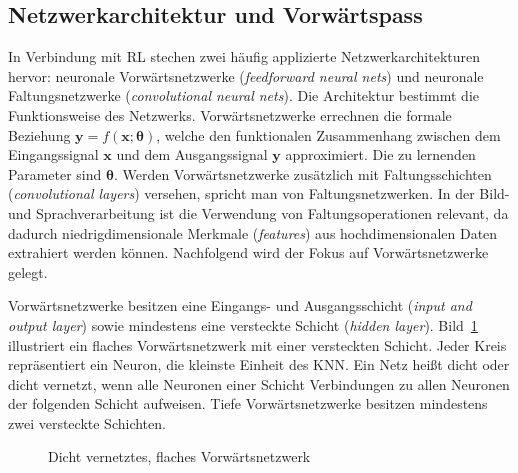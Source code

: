 \subsection{Netzwerkarchitektur und Vorwärtspass}
\label{subsec:architektur_vorwaertspass}

In Verbindung mit RL stechen zwei häufig applizierte Netzwerkarchitekturen hervor: neuronale Vorwärtsnetzwerke (\textit{feedforward neural nets}) und neuronale Faltungsnetzwerke (\textit{convolutional neural nets}). Die Architektur bestimmt die Funktionsweise des Netzwerks. Vorwärtsnetzwerke errechnen die formale Beziehung
$\bm{y} = f(\bm{x};\bm{\theta})$,
welche den funktionalen Zusammenhang zwischen dem Eingangssignal $\bm{x}$ und dem Ausgangssignal $\bm{y}$ approximiert. Die zu lernenden Parameter sind $\bm{\theta}$. Werden Vorwärtsnetzwerke zusätzlich mit Faltungsschichten (\textit{convolutional layers}) versehen, spricht man von Faltungsnetzwerken. In der Bild- und Sprachverarbeitung ist die Verwendung von Faltungsoperationen relevant, da dadurch niedrigdimensionale Merkmale (\textit{features}) aus hochdimensionalen Daten extrahiert werden können. Nachfolgend wird der Fokus auf Vorwärtsnetzwerke gelegt. 
\newline

Vorwärtsnetzwerke besitzen eine Eingangs- und Ausgangsschicht (\textit{input and output layer}) sowie mindestens eine versteckte Schicht (\textit{hidden layer}). Bild~\ref{fig:knn} illustriert ein flaches Vorwärtsnetzwerk mit einer versteckten Schicht. Jeder Kreis repräsentiert ein Neuron, die kleinste Einheit des KNN. Ein Netz heißt dicht oder dicht vernetzt, wenn alle Neuronen einer Schicht Verbindungen zu allen Neuronen der folgenden Schicht aufweisen. Tiefe Vorwärtsnetzwerke besitzen mindestens zwei versteckte Schichten. 
\begin{figure}[h]
\centering
\def\svgwidth{0.7\textwidth}

\caption[Dicht vernetztes, flaches Vorwärtsnetzwerk]{Dicht vernetztes, flaches Vorwärtsnetzwerk}
\label{fig:knn}
\end{figure}

